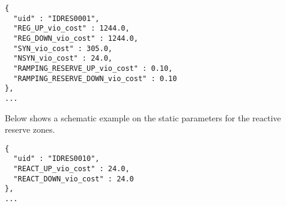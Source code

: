 \begin{verbatim}
{
  "uid" : "IDRES0001",
  "REG_UP_vio_cost" : 1244.0,
  "REG_DOWN_vio_cost" : 1244.0,
  "SYN_vio_cost" : 305.0,
  "NSYN_vio_cost" : 24.0,  
  "RAMPING_RESERVE_UP_vio_cost" : 0.10,  
  "RAMPING_RESERVE_DOWN_vio_cost" : 0.10
},
...
\end{verbatim}


Below shows a schematic example on the static parameters for the reactive reserve zones. 
\begin{verbatim}
{
  "uid" : "IDRES0010",
  "REACT_UP_vio_cost" : 24.0,
  "REACT_DOWN_vio_cost" : 24.0
},
...
\end{verbatim}




